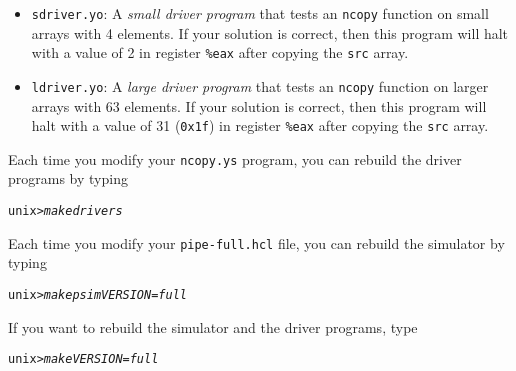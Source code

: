 \documentclass[11pt]{article}
\newenvironment{tty}%
{\small\begin{alltt}}%
{\end{alltt}}
\begin{document}
\begin{itemize}
\item \texttt{sdriver.yo}: A {\em small driver program} that tests
an \texttt{ncopy} function on small arrays with 4 elements.  
If your solution is correct, then this program will halt with a value
of 2 in register \texttt{\%eax} after copying the \texttt{src}
array.

\item \texttt{ldriver.yo}: A {\em large driver program} that tests
an \texttt{ncopy} function on larger arrays with 63 elements.  If
your solution is correct, then this program will halt with a value of
31 (\texttt{0x1f}) in register \texttt{\%eax} after copying the
\texttt{src} array.
\end{itemize}
Each time you modify your \texttt{ncopy.ys} program, you can 
rebuild the driver programs by typing
\begin{tty}
unix> {\em make drivers}
\end{tty}
Each time you modify your \texttt{pipe-full.hcl} file, you 
can rebuild the simulator by typing 
\begin{tty}
unix> {\em make psim VERSION=full}
\end{tty}
If you want to rebuild the simulator and the driver programs, type
\begin{tty}
unix> {\em make VERSION=full}
\end{tty}
\end{document}
